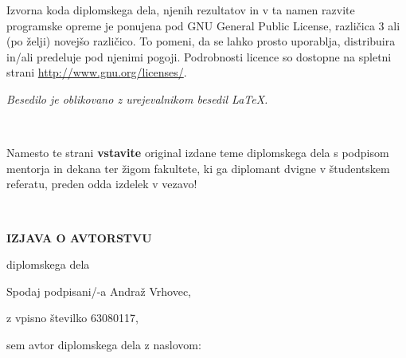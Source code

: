\documentclass[12pt,a4paper,openany]{book}
\begin{document}
\vspace*{1.5cm}
{\small \noindent
Izvorna koda diplomskega dela, njenih rezultatov in v ta namen razvite programske opreme je ponujena pod GNU General Public License,
različica 3 ali (po želji) novejšo različico. To pomeni, da se lahko prosto uporablja, distribuira in/ali predeluje pod njenimi pogoji.
Podrobnosti licence so dostopne na spletni strani \url{http://www.gnu.org/licenses/}.
}

\begin{center}
\vfill
{\em
Besedilo je oblikovano z urejevalnikom besedil \LaTeX.
}
\end{center}

\newpage

\ \thispagestyle{empty}

\newpage


\thispagestyle{empty}

Namesto te strani {\bf vstavite} original izdane teme diplomskega dela s podpisom mentorja in dekana ter žigom fakultete, ki ga diplomant
dvigne v študentskem referatu, preden odda izdelek v vezavo!

\newpage


\ \thispagestyle{empty}

\newpage



\thispagestyle{empty}

\vspace{1cm}
\begin{center}
{\Large \textbf{IZJAVA O AVTORSTVU}}
\end{center}

\begin{center}
{\Large diplomskega dela}
\end{center}

\vspace{1cm}
Spodaj podpisani/-a \hspace{0.5cm} Andraž Vrhovec,

\vspace{0.5cm}
z vpisno številko \hspace{0.5cm} 63080117,

\vspace{1cm}
sem avtor diplomskega dela z naslovom:
\end{document}
